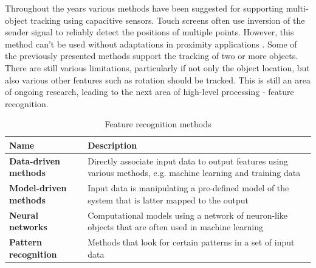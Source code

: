 Throughout the years various methods have been suggested for supporting multi-object tracking using capacitive sensors. Touch screens often use inversion of the sender signal to reliably detect the positions of multiple points. However, this method can't be used without adaptations in proximity applications \cite{wilson2007}. Some of the previously presented methods support the tracking of two or more objects. There are still various limitations, particularly if not only the object location, but also various other features such as rotation should be tracked. This is still an area of ongoing research, leading to the next area of high-level processing - feature recognition.
\begin{table}[htbp]
  \centering
  \caption{Feature recognition methods}
    \begin{tabular}{lp{7cm}}
    \toprule
    \textbf{Name} & \textbf{Description} \\
    \midrule
    \textbf{Data-driven  methods} & Directly associate input data to output features using various methods, e.g. machine learning and training data \\ \addlinespace
    \textbf{Model-driven methods} & Input data is manipulating a pre-defined model of the system that is latter mapped to the output \\ \addlinespace
    \textbf{Neural networks} & Computational models using a network of neuron-like objects that are often used in machine learning \\ \addlinespace
    \textbf{Pattern recognition} & Methods that look for certain patterns in a set of input data \\
    \bottomrule
    \end{tabular}%
  \label{tab:rel_feature}%
\end{table}%

